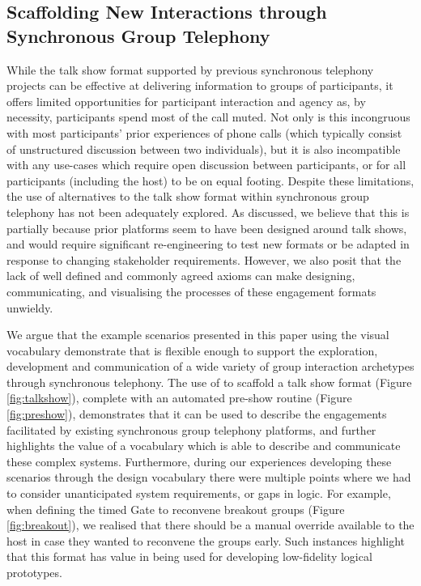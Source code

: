 
\subsection{Scaffolding New Interactions through Synchronous Group Telephony}

While the talk show format supported by previous synchronous telephony projects can be effective at delivering information to groups of participants, it offers limited opportunities for participant interaction and agency as, by necessity, participants spend most of the call muted. Not only is this incongruous with most participants' prior experiences of phone calls (which typically consist of unstructured discussion between two individuals), but it is also incompatible with any use-cases which require open discussion between participants, or for all participants (including the host) to be on equal footing. Despite these limitations, the use of alternatives to the talk show format within synchronous group telephony has not been adequately explored. As discussed, we believe that this is partially because prior platforms seem to have been designed around talk shows, and would require significant re-engineering to test new formats or be adapted in response to changing stakeholder requirements. However, we also posit that the lack of well defined and commonly agreed axioms can make designing, communicating, and visualising the processes of these engagement formats unwieldy.

We argue that the example scenarios presented in this paper using the visual vocabulary demonstrate that \ONT{} is flexible enough to support the exploration, development and communication of a wide variety of group interaction archetypes through synchronous telephony. The use of \ONT{} to scaffold a talk show format (Figure \ref{fig:talkshow}), complete with an automated pre-show routine (Figure \ref{fig:preshow}), demonstrates that it can be used to describe the engagements facilitated by existing synchronous group telephony platforms, and further highlights the value of a vocabulary which is able to describe and communicate these complex systems. Furthermore, during our experiences developing these scenarios through the design vocabulary there were multiple points where we had to consider unanticipated system requirements, or gaps in logic. For example, when defining the timed Gate to reconvene breakout groups (Figure \ref{fig:breakout}), we realised that there should be a manual override available to the host in case they wanted to reconvene the groups early. Such instances highlight that this format has value in being used for developing low-fidelity logical prototypes.

